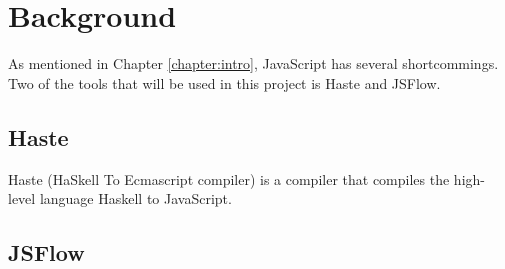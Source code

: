 \section{Background}
As mentioned in Chapter \ref{chapter:intro}, JavaScript has several shortcommings. Two of the tools that will be used in this project is Haste\cite{haste-lang,haste-symposium} and JSFlow\cite{jsflow,jsflow-csf12,jsflow-sac14}.
\subsection{Haste}
Haste (HaSkell To Ecmascript compiler) is a compiler that compiles the high-level language Haskell to JavaScript. 
\subsection{JSFlow}

